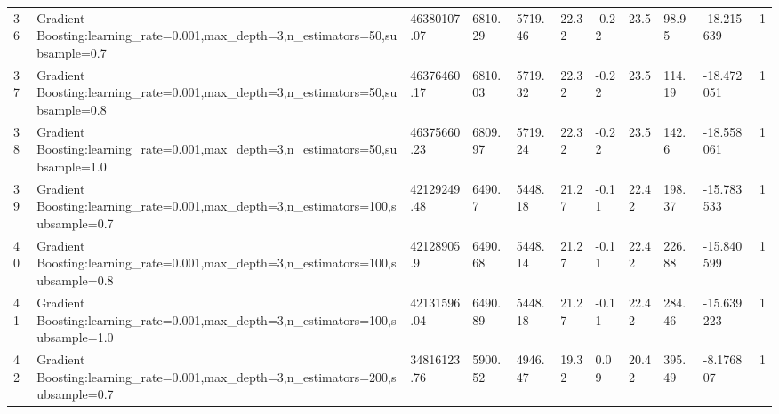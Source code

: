 \begin{longtable}{C{0.8cm} L{2cm} C{1.15cm} C{1.15cm} C{1.15cm} C{1.15cm} C{0.85cm} C{1.25cm} C{1.2cm} C{1.5cm} C{1.0cm}}
36 & Gradient Boosting:\newline learning\_rate=0.001,\newline max\_depth=3,\newline n\_estimators=50,\newline subsample=0.7 & 46380107.07 & 6810.29 & 5719.46 & 22.32 & -0.22 & 23.5 & 98.95 & -18.215639 & 1 \\
37 & Gradient Boosting:\newline learning\_rate=0.001,\newline max\_depth=3,\newline n\_estimators=50,\newline subsample=0.8 & 46376460.17 & 6810.03 & 5719.32 & 22.32 & -0.22 & 23.5 & 114.19 & -18.472051 & 1 \\
38 & Gradient Boosting:\newline learning\_rate=0.001,\newline max\_depth=3,\newline n\_estimators=50,\newline subsample=1.0 & 46375660.23 & 6809.97 & 5719.24 & 22.32 & -0.22 & 23.5 & 142.6 & -18.558061 & 1 \\
39 & Gradient Boosting:\newline learning\_rate=0.001,\newline max\_depth=3,\newline n\_estimators=100,\newline subsample=0.7 & 42129249.48 & 6490.7 & 5448.18 & 21.27 & -0.11 & 22.42 & 198.37 & -15.783533 & 1 \\
40 & Gradient Boosting:\newline learning\_rate=0.001,\newline max\_depth=3,\newline n\_estimators=100,\newline subsample=0.8 & 42128905.9 & 6490.68 & 5448.14 & 21.27 & -0.11 & 22.42 & 226.88 & -15.840599 & 1 \\
41 & Gradient Boosting:\newline learning\_rate=0.001,\newline max\_depth=3,\newline n\_estimators=100,\newline subsample=1.0 & 42131596.04 & 6490.89 & 5448.18 & 21.27 & -0.11 & 22.42 & 284.46 & -15.639223 & 1 \\
42 & Gradient Boosting:\newline learning\_rate=0.001,\newline max\_depth=3,\newline n\_estimators=200,\newline subsample=0.7 & 34816123.76 & 5900.52 & 4946.47 & 19.32 & 0.09 & 20.42 & 395.49 & -8.176807 & 1 \\

\end{longtable}
